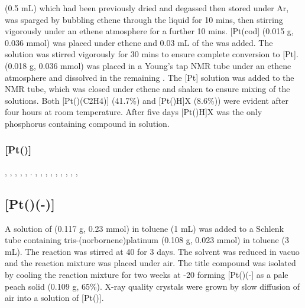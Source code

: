  (0.5 mL) which had been previously dried and degassed then stored under Ar, was sparged by bubbling ethene through the liquid for 10 mins, then stirring vigorously under an ethene atmosphere for a further 10 mins.  [Pt(cod] (0.015 g, 0.036 mmol) was placed under ethene and 0.03 mL of the  was added.  The solution was stirred vigorously for 30 mins to ensure complete conversion to [Pt].  \tBuxantphos(0.018 g, 0.036 mmol) was placed in a Young's tap NMR tube under an ethene atmosphere and dissolved in the remaining .  The [Pt] solution was added to the NMR tube, which was closed under ethene and shaken to ensure mixing of the solutions.  Both [Pt(\tBuxantphos)\ce({C2H4})] (41.7\%) and [Pt(\tBuxantphos)H]X (8.6\%)) were evident after four hours at room temperature.  After five days [Pt(\tBuxantphos)H]X was the only phosphorus containing compound in solution.

\subsubsection*{[Pt(\tBuxantphos)]}

,
,
,
,
,
.
,
,
,
,
,
,
,
,
,

\subsection*{\texorpdfstring{[Pt(\tButhixantphos)(-)]} P}


A solution of \tButhixantphos{} (0.117 g, 0.23 mmol) in toluene (1 mL) was added to a Schlenk tube containing tris-(norbornene)platinum (0.108 g, 0.023 mmol) in toluene (3 mL).  The reaction was stirred at 40 \degC{} for 3 days.  The solvent was reduced in vacuo and the reaction mixture was placed under air.  The title compound was isolated by cooling the reaction mixture for two weeks at -20 \degC{} forming [Pt(\tButhixantphos)(-] as a pale peach solid (0.109 g, 65\%).  X-ray quality crystals were grown by slow diffusion of air into a  solution of [Pt(\tButhixantphos)].

